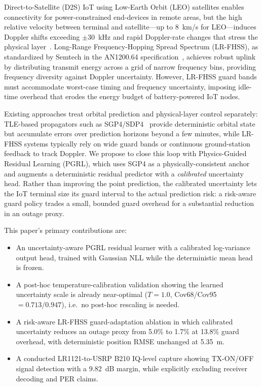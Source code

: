 \documentclass[conference]{IEEEtran}
\begin{document}
Direct-to-Satellite (D2S) IoT using Low-Earth Orbit (LEO) satellites enables connectivity for power-constrained end-devices in remote areas, but the high relative velocity between terminal and satellite---up to 8~km/s for LEO---induces Doppler shifts exceeding $\pm 30$~kHz and rapid Doppler-rate changes that stress the physical layer~\cite{hurn2023lrfhss}. Long-Range Frequency-Hopping Spread Spectrum (LR-FHSS), as standardized by Semtech in the AN1200.64 specification~\cite{semtech2023lrfhss}, achieves robust uplink by distributing transmit energy across a grid of narrow frequency bins, providing frequency diversity against Doppler uncertainty. However, LR-FHSS guard bands must accommodate worst-case timing and frequency uncertainty, imposing idle-time overhead that erodes the energy budget of battery-powered IoT nodes.

Existing approaches treat orbital prediction and physical-layer control separately: TLE-based propagators such as SGP4/SDP4~\cite{vallado2007fundamentals} provide deterministic orbital state but accumulate errors over prediction horizons beyond a few minutes, while LR-FHSS systems typically rely on wide guard bands or continuous ground-station feedback to track Doppler. We propose to close this loop with Physics-Guided Residual Learning (PGRL), which uses SGP4 as a physically-consistent anchor and augments a deterministic residual predictor with a \emph{calibrated} uncertainty head. Rather than improving the point prediction, the calibrated uncertainty lets the IoT terminal size its guard interval to the actual prediction risk: a risk-aware guard policy trades a small, bounded guard overhead for a substantial reduction in an outage proxy.

This paper's primary contributions are:
\begin{itemize}
  \item An uncertainty-aware PGRL residual learner with a calibrated log-variance output head, trained with Gaussian NLL while the deterministic mean head is frozen.
  \item A post-hoc temperature-calibration validation showing the learned uncertainty scale is already near-optimal ($T=1.0$, Cov68/Cov95 $=0.713/0.947$), i.e.\ no post-hoc rescaling is needed.
  \item A risk-aware LR-FHSS guard-adaptation ablation in which calibrated uncertainty reduces an outage proxy from 5.0\% to 1.7\% at 13.8\% guard overhead, with deterministic position RMSE unchanged at 5.35~m.
  \item A conducted LR1121-to-USRP B210 IQ-level capture showing TX-ON/OFF signal detection with a 9.82~dB margin, while explicitly excluding receiver decoding and PER claims.
\end{itemize}
\end{document}
